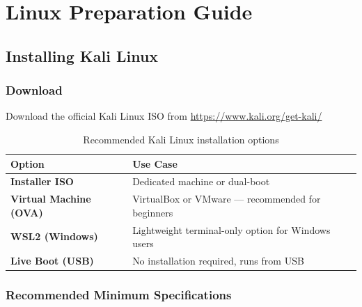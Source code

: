 \chapter{Linux Preparation Guide}
\label{ch:linux}


\section{Installing Kali Linux}

\subsection{Download}

Download the official Kali Linux ISO from \url{https://www.kali.org/get-kali/}

\begin{table}[H]
\centering
\caption{Recommended Kali Linux installation options}
\begin{tabularx}{\textwidth}{>{\bfseries}lX}
\toprule
Option & Use Case \\
\midrule
Installer ISO & Dedicated machine or dual-boot \\
Virtual Machine (OVA) & VirtualBox or VMware — recommended for beginners \\
WSL2 (Windows) & Lightweight terminal-only option for Windows users \\
Live Boot (USB) & No installation required, runs from USB \\
\bottomrule
\end{tabularx}
\end{table}


\subsection{Recommended Minimum Specifications}


